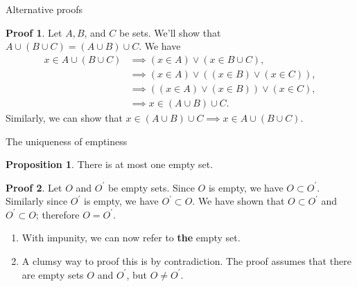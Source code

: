 \documentclass[fleqn]{beamer}
\theoremstyle{definition}
\newtheorem{myth}{Proposition}
\newtheorem{myproof}{Proof}
\begin{document}
\begin{frame}{Alternative proofs}


\begin{myproof}  Let \(A,B\), and \(C\) be sets.  We'll show that \(A \cup (B \cup C) =  (A \cup B) \cup C\).
We have
\begin{align*}
  x \in A \cup (B \cup C)  &\implies (x \in A) \lor (x \in B \cup C), \\
                                            &\implies  (x \in A) \lor ( (x \in  B) \lor (x \in C)), \\
                                           &  \implies  (  (x \in A) \lor  (x \in  B) ) \lor (x \in C), \\
                                           & \implies x \in  ( A \cup B)  \cup C.
\end{align*}
Similarly, we can show that \(   x \in (A \cup B) \cup C \implies x \in A \cup (B \cup C)\).
\end{myproof}

\end{frame}
\begin{frame}{The uniqueness of emptiness}

\begin{myth} There is at most one empty set. \end{myth}

\begin{myproof} Let \(O\) and \(O^\prime\) be empty sets.  Since  \(O\) is empty, we have \(O \subset O^\prime\). Similarly since   \(O^\prime \) is empty, we have \(O^\prime  \subset O\). We have shown that \(O \subset O^\prime\) and \(O^\prime  \subset O\); therefore \(O = O^\prime\). \end{myproof}

\begin{enumerate}

\item With impunity, we can now refer to  \textbf{the} empty set.

\item A clumsy  way to proof this is by contradiction. The proof assumes that there are empty sets \(O\) and \(O^\prime\), but \(O \neq O^\prime\).

\end{enumerate}
\end{frame}
\end{document}
